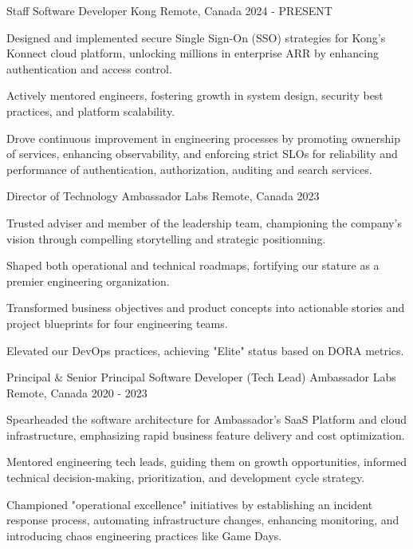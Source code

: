 
\begin{cventries}

  \cventry
    {Staff Software Developer} %
    {Kong} %
    {Remote, Canada} %
    {2024 - PRESENT} %
    {
      \begin{cvitems} %
        \item {Designed and implemented secure Single Sign-On (SSO) strategies for Kong's Konnect cloud platform, unlocking millions in enterprise ARR by enhancing authentication and access control.}
        \item {Actively mentored engineers, fostering growth in system design, security best practices, and platform scalability.}
        \item {Drove continuous improvement in engineering processes by promoting ownership of services, enhancing observability, and enforcing strict SLOs for reliability and performance of authentication, authorization, auditing and search services.}
      \end{cvitems}
    }

  \cventry
    {Director of Technology} %
    {Ambassador Labs} %
    {Remote, Canada} %
    {2023} %
    {
      \begin{cvitems} %
        \item {Trusted adviser and member of the leadership team, championing the company's vision through compelling storytelling and strategic positionning.}
        \item {Shaped both operational and technical roadmaps, fortifying our stature as a premier engineering organization.}
        \item {Transformed business objectives and product concepts into actionable stories and project blueprints for four engineering teams.}
        \item {Elevated our DevOps practices, achieving "Elite" status based on DORA metrics.}
      \end{cvitems}
    }

  \cventry
    {Principal \& Senior Principal Software Developer (Tech Lead)} %
    {Ambassador Labs} %
    {Remote, Canada} %
    {2020 - 2023} %
    {
      \begin{cvitems} %
        \item {Spearheaded the software architecture for Ambassador's SaaS Platform and cloud infrastructure, emphasizing rapid business feature delivery and cost optimization.}
        \item {Mentored engineering tech leads, guiding them on growth opportunities, informed technical decision-making, prioritization, and development cycle strategy.}
        \item {Championed "operational excellence" initiatives by establishing an incident response process, automating infrastructure changes, enhancing monitoring, and introducing chaos engineering practices like Game Days.}
      \end{cvitems}
    }


\end{cventries}
